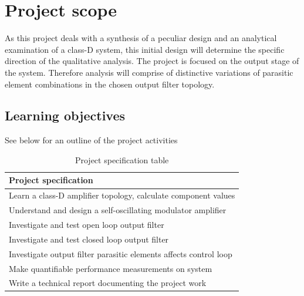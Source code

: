 \section{Project scope}
As this project deals with a synthesis of a peculiar design and an analytical examination of a class-D system, this initial design will determine the specific direction of the qualitative analysis. The project is focused on the output stage of the system. Therefore analysis will comprise of distinctive variations of parasitic element combinations in the chosen output filter topology.

\subsection{Learning objectives}
See below for an outline of the project activities
\begin{table}[ht!]
	\centering
	\begin{tabular}{@{}l@{}}
		\toprule
		\textbf{Project specification}									\\ \midrule
		Learn a class-D amplifier topology, calculate component values	\\
		Understand and design a self-oscillating modulator amplifier	\\
		Investigate and test open loop output filter					\\
		Investigate and test closed loop output filter					\\
		Investigate output filter parasitic elements affects control loop\\
		Make quantifiable performance measurements on system			\\
		Write a technical report documenting the project work			\\ \bottomrule
	\end{tabular}
	\caption{Project specification table}
	\label{tab:specifications}
\end{table}

